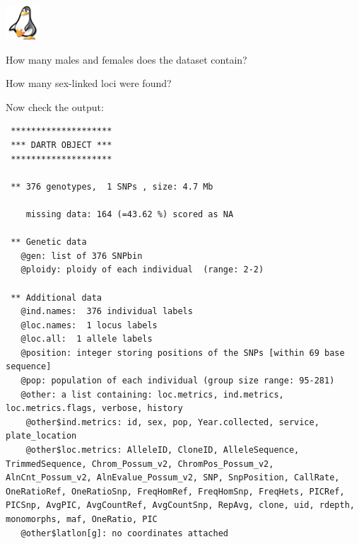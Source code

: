 \documentclass[
  letterpaper,
  DIV=11,
  numbers=noendperiod]{scrreprt}
\newenvironment{Shaded}{\begin{snugshade}}{\end{snugshade}}
\newcommand{\CommentTok}[1]{\textcolor[rgb]{0.38,0.63,0.69}{\textit{#1}}}
\newcommand{\NormalTok}[1]{\textcolor[rgb]{0.00,0.44,0.13}{#1}}
\newcommand{\SpecialCharTok}[1]{\textcolor[rgb]{0.25,0.44,0.63}{#1}}
\begin{document}
\begin{tcolorbox}[enhanced jigsaw, coltitle=black, colframe=quarto-callout-note-color-frame, colbacktitle=quarto-callout-note-color!10!white, breakable, bottomtitle=1mm, rightrule=.15mm, opacitybacktitle=0.6, left=2mm, arc=.35mm, opacityback=0, leftrule=.75mm, toptitle=1mm, titlerule=0mm, title=\textcolor{quarto-callout-note-color}{\faInfo}\hspace{0.5em}{Exercise}, bottomrule=.15mm, toprule=.15mm, colback=white]

\includegraphics[width=0.5in,height=0.5in]{images/task.png}

How many males and females does the dataset contain?

How many sex-linked loci were found?

\end{tcolorbox}

Now check the output:

\begin{Shaded}
\end{Shaded}

\begin{verbatim}
 ********************
 *** DARTR OBJECT ***
 ********************

 ** 376 genotypes,  1 SNPs , size: 4.7 Mb

    missing data: 164 (=43.62 %) scored as NA

 ** Genetic data
   @gen: list of 376 SNPbin
   @ploidy: ploidy of each individual  (range: 2-2)

 ** Additional data
   @ind.names:  376 individual labels
   @loc.names:  1 locus labels
   @loc.all:  1 allele labels
   @position: integer storing positions of the SNPs [within 69 base sequence]
   @pop: population of each individual (group size range: 95-281)
   @other: a list containing: loc.metrics, ind.metrics, loc.metrics.flags, verbose, history 
    @other$ind.metrics: id, sex, pop, Year.collected, service, plate_location 
    @other$loc.metrics: AlleleID, CloneID, AlleleSequence, TrimmedSequence, Chrom_Possum_v2, ChromPos_Possum_v2, AlnCnt_Possum_v2, AlnEvalue_Possum_v2, SNP, SnpPosition, CallRate, OneRatioRef, OneRatioSnp, FreqHomRef, FreqHomSnp, FreqHets, PICRef, PICSnp, AvgPIC, AvgCountRef, AvgCountSnp, RepAvg, clone, uid, rdepth, monomorphs, maf, OneRatio, PIC 
   @other$latlon[g]: no coordinates attached
\end{verbatim}
\end{document}
